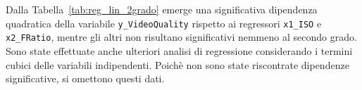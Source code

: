 Dalla Tabella~\ref{tab:reg_lin_2grado} emerge una significativa dipendenza quadratica della variabile \texttt{y\_VideoQuality} rispetto ai regressori \texttt{x1\_ISO} e \texttt{x2\_FRatio}, mentre gli altri non risultano significativi nemmeno al secondo grado. \\

Sono state effettuate anche ulteriori analisi di regressione considerando i termini cubici delle variabili indipendenti. Poichè non sono state riscontrate dipendenze significative, si omettono questi dati.
